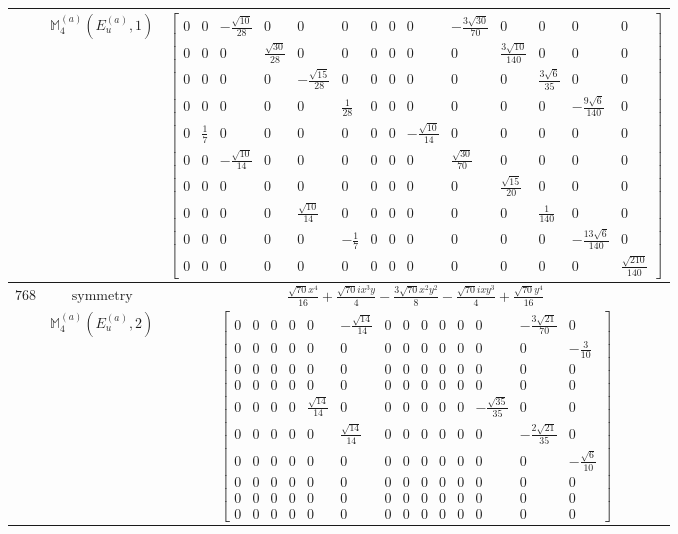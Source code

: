 \documentclass[fleqn,8pt,landscape]{jsarticle}
\begin{document}
\begin{longtable}{ccc}
$  $ & $ \mathbb{M}_{4}^{(a)}(E_{u}^{(a)},1) $ & $ \begin{bmatrix} 0 & 0 & - \frac{\sqrt{10}}{28} & 0 & 0 & 0 & 0 & 0 & 0 & - \frac{3 \sqrt{30}}{70} & 0 & 0 & 0 & 0 \\ 0 & 0 & 0 & \frac{\sqrt{30}}{28} & 0 & 0 & 0 & 0 & 0 & 0 & \frac{3 \sqrt{10}}{140} & 0 & 0 & 0 \\ 0 & 0 & 0 & 0 & - \frac{\sqrt{15}}{28} & 0 & 0 & 0 & 0 & 0 & 0 & \frac{3 \sqrt{6}}{35} & 0 & 0 \\ 0 & 0 & 0 & 0 & 0 & \frac{1}{28} & 0 & 0 & 0 & 0 & 0 & 0 & - \frac{9 \sqrt{6}}{140} & 0 \\ 0 & \frac{1}{7} & 0 & 0 & 0 & 0 & 0 & 0 & - \frac{\sqrt{10}}{14} & 0 & 0 & 0 & 0 & 0 \\ 0 & 0 & - \frac{\sqrt{10}}{14} & 0 & 0 & 0 & 0 & 0 & 0 & \frac{\sqrt{30}}{70} & 0 & 0 & 0 & 0 \\ 0 & 0 & 0 & 0 & 0 & 0 & 0 & 0 & 0 & 0 & \frac{\sqrt{15}}{20} & 0 & 0 & 0 \\ 0 & 0 & 0 & 0 & \frac{\sqrt{10}}{14} & 0 & 0 & 0 & 0 & 0 & 0 & \frac{1}{140} & 0 & 0 \\ 0 & 0 & 0 & 0 & 0 & - \frac{1}{7} & 0 & 0 & 0 & 0 & 0 & 0 & - \frac{13 \sqrt{6}}{140} & 0 \\ 0 & 0 & 0 & 0 & 0 & 0 & 0 & 0 & 0 & 0 & 0 & 0 & 0 & \frac{\sqrt{210}}{140} \end{bmatrix} $ \\ \hline
$ 768 $ & $ \text{symmetry} $ & $ \frac{\sqrt{70} x^{4}}{16} + \frac{\sqrt{70} i x^{3} y}{4} - \frac{3 \sqrt{70} x^{2} y^{2}}{8} - \frac{\sqrt{70} i x y^{3}}{4} + \frac{\sqrt{70} y^{4}}{16} $ \\
$  $ & $ \mathbb{M}_{4}^{(a)}(E_{u}^{(a)},2) $ & $ \begin{bmatrix} 0 & 0 & 0 & 0 & 0 & - \frac{\sqrt{14}}{14} & 0 & 0 & 0 & 0 & 0 & 0 & - \frac{3 \sqrt{21}}{70} & 0 \\ 0 & 0 & 0 & 0 & 0 & 0 & 0 & 0 & 0 & 0 & 0 & 0 & 0 & - \frac{3}{10} \\ 0 & 0 & 0 & 0 & 0 & 0 & 0 & 0 & 0 & 0 & 0 & 0 & 0 & 0 \\ 0 & 0 & 0 & 0 & 0 & 0 & 0 & 0 & 0 & 0 & 0 & 0 & 0 & 0 \\ 0 & 0 & 0 & 0 & \frac{\sqrt{14}}{14} & 0 & 0 & 0 & 0 & 0 & 0 & - \frac{\sqrt{35}}{35} & 0 & 0 \\ 0 & 0 & 0 & 0 & 0 & \frac{\sqrt{14}}{14} & 0 & 0 & 0 & 0 & 0 & 0 & - \frac{2 \sqrt{21}}{35} & 0 \\ 0 & 0 & 0 & 0 & 0 & 0 & 0 & 0 & 0 & 0 & 0 & 0 & 0 & - \frac{\sqrt{6}}{10} \\ 0 & 0 & 0 & 0 & 0 & 0 & 0 & 0 & 0 & 0 & 0 & 0 & 0 & 0 \\ 0 & 0 & 0 & 0 & 0 & 0 & 0 & 0 & 0 & 0 & 0 & 0 & 0 & 0 \\ 0 & 0 & 0 & 0 & 0 & 0 & 0 & 0 & 0 & 0 & 0 & 0 & 0 & 0 \end{bmatrix} $ \\ \hline

\end{longtable}
\end{document}
